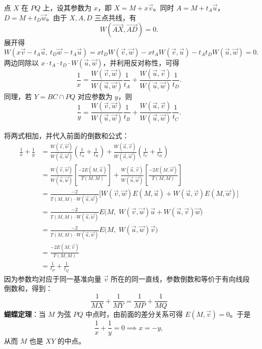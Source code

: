 点 $X$ 在 $PQ$ 上，设其参数为 $x$，即 $X = M + x\vec{v}$。同时 $A = M+t_A\vec{u}$，$D = M+t_D\vec{w}$。由于 $X, A, D$ 三点共线，有
\[
W(\overrightarrow{AX}, \overrightarrow{AD}) = 0.
\]
展开得
\[
W(x\vec{v} - t_A\vec{u}, \ t_D\vec{w} - t_A\vec{u}) = x t_D W(\vec{v}, \vec{w}) - x t_A W(\vec{v}, \vec{u}) - t_A t_D W(\vec{u}, \vec{w}) = 0.
\]
两边同除以 $x \cdot t_A \cdot t_D \cdot W(\vec{u}, \vec{w})$，并利用反对称性，可得
\[
\frac{1}{x} = \frac{W(\vec{v}, \vec{w})}{W(\vec{u}, \vec{w})} \frac{1}{t_A} + \frac{W(\vec{u}, \vec{v})}{W(\vec{u}, \vec{w})} \frac{1}{t_D}.
\]
同理，若 $Y = BC \cap PQ$ 对应参数为 $y$，则
\[
\frac{1}{y} = \frac{W(\vec{v}, \vec{w})}{W(\vec{u}, \vec{w})} \frac{1}{t_B} + \frac{W(\vec{u}, \vec{v})}{W(\vec{u}, \vec{w})} \frac{1}{t_C}.
\]

将两式相加，并代入前面的倒数和公式：
\begin{align*}
\frac{1}{x} + \frac{1}{y} &= \frac{W(\vec{v}, \vec{w})}{W(\vec{u}, \vec{w})}\left(\frac{1}{t_A} + \frac{1}{t_B}\right) + \frac{W(\vec{u}, \vec{v})}{W(\vec{u}, \vec{w})}\left(\frac{1}{t_C} + \frac{1}{t_D}\right) \\
&= \frac{W(\vec{v}, \vec{w})}{W(\vec{u}, \vec{w})}\left[ \frac{-2E(M, \vec{u})}{T(M,M)} \right] + \frac{W(\vec{u}, \vec{v})}{W(\vec{u}, \vec{w})}\left[ \frac{-2E(M, \vec{w})}{T(M,M)} \right] \\
&= \frac{-2}{T(M,M) \cdot W(\vec{u}, \vec{w})} \Big[ W(\vec{v}, \vec{w})E(M, \vec{u}) + W(\vec{u}, \vec{v})E(M, \vec{w}) \Big] \\
&= \frac{-2}{T(M,M) \cdot W(\vec{u}, \vec{w})} E\Big(M, \; W(\vec{v}, \vec{w})\vec{u} + W(\vec{u}, \vec{v})\vec{w} \Big) \\
&= \frac{-2}{T(M,M) \cdot W(\vec{u}, \vec{w})} E\Big(M, \; W(\vec{u}, \vec{w})\vec{v} \Big) \\
&= \frac{-2E(M, \vec{v})}{T(M,M)} \\
&= \frac{1}{t_P} + \frac{1}{t_Q}
\end{align*}
因为参数均对应于同一基准向量 $\vec{v}$ 所在的同一直线，参数倒数和等价于有向线段倒数和，得到：
$$ \frac{1}{MX} + \frac{1}{MY} = \frac{1}{MP} + \frac{1}{MQ} $$
\textbf{蝴蝶定理}：当 $M$ 为弦 $PQ$ 中点时，由前面的差分关系可得 $E(M, \vec{v}) = 0$。于是
\[
\frac{1}{x} + \frac{1}{y} = 0 \implies x = -y,
\]
从而 $M$ 也是 $XY$ 的中点。

